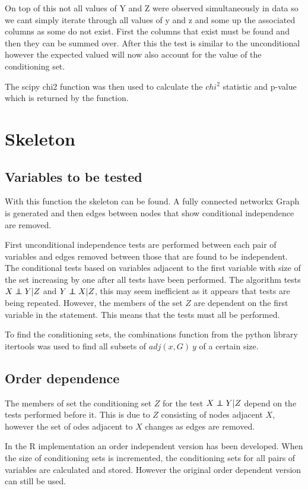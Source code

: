 \documentclass{UoYCSproject}
\newcommand\independent{\protect\mathpalette{\protect\independenT}{\perp}}
\def\independenT#1#2{\mathrel{\rlap{$#1#2$}\mkern2mu{#1#2}}}
\begin{document}
On top of this not all values of Y and Z were observed simultaneously in data so
we cant simply iterate through all values of y and z and some up the associated columns as some do not exist. First the columns that exist must be found and then they can be summed over. After this the test is similar to the unconditional however the expected valued will now also account for the value of the conditioning set.

The scipy chi2 function was then used to calculate the $chi^2$ statistic and p-value which is returned by the function.
\section{Skeleton}
\subsection{Variables to be tested}
With this function the skeleton can be found. A fully connected networkx Graph is generated and then edges between nodes that show conditional independence are removed. 

First unconditional independence tests are performed between each pair of variables and edges removed between those that are found to be independent. The conditional tests based on variables adjacent to the first variable with size of the set increasing by one after all tests have been performed. The algorithm tests $X \independent Y | Z$ and $Y \independent X | Z$, this may seem inefficient as it appears that tests are being repeated. However, the members of the set $Z$ are dependent on the first variable in the statement. This means that the tests must all be performed.

To find the conditioning sets, the combinations function from the python library itertools was used to find all subsets of $adj(x,G)\ y$ of a certain size.

\subsection{Order dependence}
The members of set the conditioning set $ Z $ for the test $X \independent Y|Z$ depend on the tests performed before it. This is due to $Z$ consisting of nodes adjacent $X$, however the set of odes adjacent to $X$ changes as edges are removed.

In the R implementation an order independent version has been developed. When the size of conditioning sets is incremented, the conditioning sets for all pairs of variables  are calculated and stored. However the original order dependent version can still be used.
\end{document}
